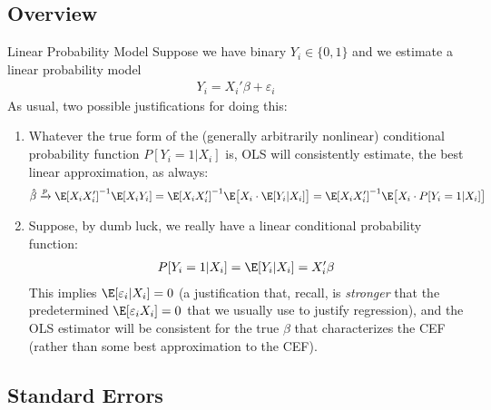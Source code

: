 \documentclass[aspectratio=169, handout]{beamer}
\newcommand{\pto}{\xrightarrow{p}}
\begin{document}
\subsection{Overview}

{\footnotesize
\begin{frame}{Linear Probability Model}
Suppose we have binary $Y_i\in\{0,1\}$ and we estimate a linear
probability model
\begin{align*}
  Y_i = X_i'\beta + \varepsilon_i
\end{align*}
As usual, two possible justifications for doing this:
\begin{enumerate}
  \item Whatever the true form of the (generally arbitrarily nonlinear)
    conditional probability function $P[Y_i=1|X_i]$ is, OLS will
    consistently estimate, the \alert{best linear approximation}, as
    always:
    \begin{align*}
      \hat{\beta}
      \pto
      \E[X_iX_i']^{-1}\E[X_iY_i]
      =
      \E[X_iX_i']^{-1}\E\big[X_i\cdot\E[Y_i|X_i]\big]
      =
      \E[X_iX_i']^{-1}\E\big[X_i\cdot P[Y_i=1|X_i]\big]
    \end{align*}

  \item Suppose, by dumb luck, we really have a
    \alert{linear conditional probability function}:
    \begin{align*}
      P[Y_i=1|X_i]
      =
      \E[Y_i|X_i]
      =
      X_i'\beta
    \end{align*}
    This implies $\E[\varepsilon_i|X_i]=0$ (a justification that,
    recall, is \emph{stronger} that the predetermined
    $\E[\varepsilon_iX_i]=0$ that we usually use to justify regression),
    and the OLS estimator will be consistent for the true $\beta$ that
    characterizes the CEF (rather than some best approximation to the
    CEF).
\end{enumerate}
\end{frame}
}


\subsection{Standard Errors}
\end{document}
